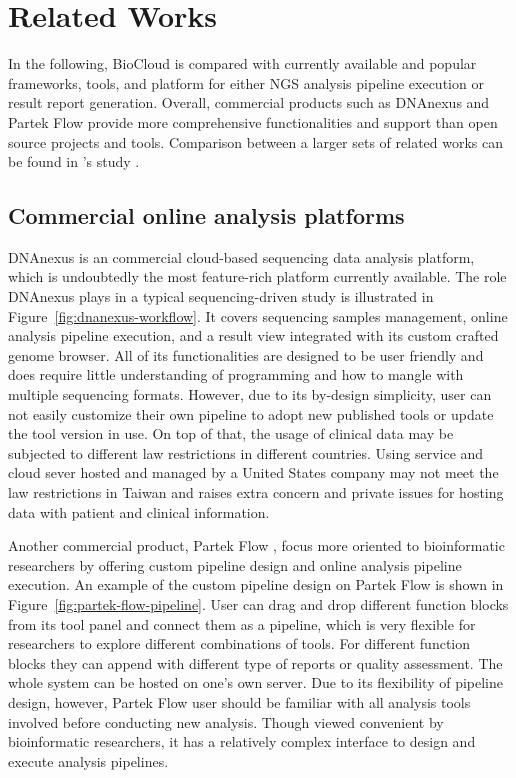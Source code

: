 \chapter{Related Works}
\label{c:related-work}

In the following, BioCloud is compared with currently available and popular
frameworks, tools, and platform for either NGS analysis pipeline execution or
result report generation. Overall, commercial products such as DNAnexus and
Partek Flow provide more comprehensive functionalities and support than open
source projects and tools. Comparison between a larger sets of related works
can be found in \citeauthor{leipzig2016:review}'s study
\cite{leipzig2016:review}.


\section{Commercial online analysis platforms}

DNAnexus \cite{:dnanexus} is an commercial cloud-based sequencing data analysis
platform, which is undoubtedly the most feature-rich platform currently
available. The role DNAnexus plays in a typical sequencing-driven study is
illustrated in Figure~\ref{fig:dnanexus-workflow}. It covers sequencing samples
management, online analysis pipeline execution, and a result view integrated
with its custom crafted genome browser. All of its functionalities are designed
to be user friendly and does require little understanding of programming and
how to mangle with multiple sequencing formats. However, due to its by-design
simplicity, user can not easily customize their own pipeline to adopt new
published tools or update the tool version in use. On top of that, the usage of
clinical data may be subjected to different law restrictions in different
countries. Using service and cloud sever hosted and managed by a United States
company may not meet the law restrictions in Taiwan and raises extra concern
and private issues for hosting data with patient and clinical information.



Another commercial product, Partek Flow \cite{:partek}, focus more oriented to
bioinformatic researchers by offering custom pipeline design and online
analysis pipeline execution. An example of the custom pipeline design on Partek
Flow is shown in Figure~\ref{fig:partek-flow-pipeline}. User can drag and drop
different function blocks from its tool panel and connect them as a pipeline,
which is very flexible for researchers to explore different combinations of
tools. For different function blocks they can append with different type of
reports or quality assessment. The whole system can be hosted on one's own
server. Due to its flexibility of pipeline design, however, Partek Flow user
should be familiar with all analysis tools involved before conducting new
analysis. Though viewed convenient by bioinformatic researchers, it has a
relatively complex interface to design and execute analysis pipelines.

